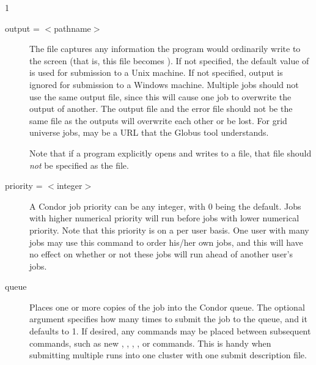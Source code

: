 \begin{ManPage}{\label{man-condor-submit}}{1}
\begin{description}
\item[output = $<$pathname$>$]
\label{man-condor-submit-output}
The  file captures
any information the program would ordinarily write to the screen
(that is, this file becomes ).
If not specified, the default value of
 is used for submission to a Unix machine.
If not specified, output is ignored
for submission to a Windows machine.
Multiple jobs should not use the same output
file, since this will cause one job to overwrite the output of
another.
The output file and the error file should not be the same file
as the outputs will overwrite each other or be lost.
For grid universe jobs,  may be a URL that the Globus
tool  understands.

Note that if a program explicitly opens and writes to a file,
that file should \emph{not} be specified as the  file.


\item[priority = $<$integer$>$] 
\label{man-condor-submit-priority}
A Condor job priority 
can be any integer, with 0 being the default.
Jobs with higher numerical priority will
run before jobs with lower numerical priority. Note that this priority
is on a per user basis.
One user with many jobs may use this command
to order his/her own jobs,
and this will have no effect on whether or
not these jobs will run ahead of another user's jobs.


\item[queue ] Places one or more
\label{man-condor-submit-queue}
copies of the job into the Condor queue.
The optional
argument  specifies how many times to submit the
job to the queue, and it defaults to 1.
If desired, any commands may be placed
between subsequent  commands, such as new ,
, , ,
or  commands.
This is handy when submitting multiple runs into one cluster with
one submit description file.


\end{description}
\end{ManPage}
